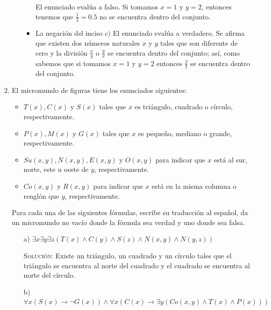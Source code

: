 \documentclass[letterpaper,11pt]{article}
\begin{document}
\begin{enumerate}
\begin{itemize}
\begin{itemize}
            El enunciado evalúa a falso. Si tomamos $x = 1$ y $y = 2$, entonces 
            tenemos que $\frac{1}{2} = 0.5$ no se encuentra dentro del conjunto.

            \item La negación del inciso $c)$   
            El enunciado evalúa a verdadero. Se afirma que existen dos números 
            naturales $x$ y $y$ tales que son diferente de cero y la división
            $\frac{x}{y}$ o $\frac{y}{x}$ se encuentra dentro del conjunto;
            así, como sabemos que si tomamos $x = 1$ y $y = 2$ entonces 
            $\frac{2}{1}$ se encuentra dentro del conjunto.       
        \end{itemize}
    \end{itemize}

    \item El micromundo de figuras tiene los enunciados siguientes:

    \begin{itemize}
        \item $T(x), C(x)$ y $S(x)$ tales que $x$ es triángulo, cuadrado o 
        círculo, respectivamente.
        \item $P(x), M(x)$ y $G(x)$ tales que $x$ es pequeño, mediano o 
        grande, respectivamente.
        \item $Su(x, y), N(x, y), E(x, y)$ y $O(x, y)$ para indicar que $x$ 
        está al sur, norte, este u oeste de $y$, respectivamente.
        \item $Co(x, y)$ y $R(x, y)$ para indicar que $x$ está en la misma 
        columna o renglón que $y$, respectivamente.
    \end{itemize}

    Para cada una de las siguientes fórmulas, escribe su traducción al español,
    da un micromundo no vacío donde la fórmula sea verdad y uno donde sea 
    falsa.

    \begin{itemize}
        \item[a)] $∃x ∃y ∃z (T(x) \land C(y) \land S(z) \land N(x, y) \land 
                  N(y,z))$

        \textsc{Solución:} Existe un triángulo, un cuadrado y un círculo tales 
        que el triángulo se encuentra al norte del cuadrado y el cuadrado se 
        encuentra al norte del círculo.

        \item[b)] $∀x (S(x) → \neg G(x)) \land ∀x (C(x) → ∃y (Co(x, y) \land 
                  T(x) \land P(x)))$


\end{itemize}
\end{enumerate}
\end{document}

